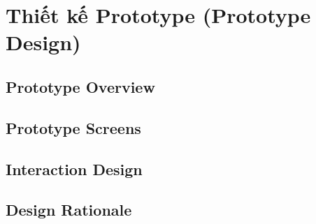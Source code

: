 \section{Thiết kế Prototype (Prototype Design)}

\subsection{Prototype Overview}

\subsection{Prototype Screens}

\subsection{Interaction Design}

\subsection{Design Rationale}
